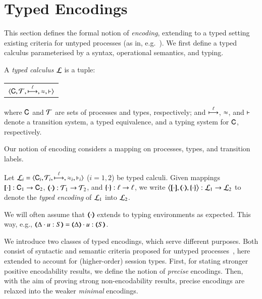 
\section{Typed Encodings}
\label{s:expr}
\label{sec:enc}

This section defines the formal notion of \emph{encoding}, 
extending to a typed setting existing criteria for untyped processes (as in,
e.g.~\cite{Nestmann00,Palamidessi03,DBLP:conf/lics/PalamidessiSVV06,DBLP:journals/iandc/Gorla10,DBLP:conf/icalp/LanesePSS10}). 
We first define a typed calculus parameterised by a syntax, operational semantics, and typing.

\begin{definition}\rm
	\label{d:tcalculus}
	A \emph{typed calculus} $\mathcal{L}$ is a tuple:
	\begin{center}
		\begin{tabular}{c}
			$\langle \mathsf{C}, \cal{T}, \stackrel{\ell}{\longmapsto}, \approx, \vdash \rangle$
		\end{tabular}
	\end{center}
	\noi where $\mathsf{C}$ and $\cal{T}$ are sets of processes and types, 
	respectively; and $\stackrel{\ell}{\longmapsto}$, $\approx$, and $\vdash$ 
	denote a transition system, a typed equivalence, and a typing system for $\mathsf{C}$, respectively. 
\end{definition}

\noi Our notion of encoding considers a mapping on processes, 
types, and transition labels.  

\begin{definition}\rm
        Let  $\mathcal{L}_i=\langle \mathsf{C}_i, {\cal{T}}_i, \stackrel{\ell}{\longmapsto}, \approx_i, \vdash_i \rangle$
        ($i=1,2$) be typed calculi. 
	Given mappings $[\!\![\cdot]\!\!]: \mathsf{C}_1 \to \mathsf{C}_2$, 
	$(\!\!\langle\cdot\rangle\!\!): {\cal{T}}_1 \to {\cal{T}}_2$, and 
	$\{\!\!\{\cdot\}\!\!\}: \ell \to \ell$, 
	we write 
	$\enco{\map{\cdot}, \mapt{\cdot}, \mapa{\cdot}} : \tyl{L}_1 \to \tyl{L}_2$ to denote the \emph{typed encoding} of $\mathcal{L}_1$ into $\mathcal{L}_2$.
\end{definition}

\noi We will often assume that  $(\!\!\langle\cdot\rangle\!\!)$ extends to typing
environments as expected. This way, e.g., $\mapt{\Delta \cat u:S} = \mapt{\Delta} \cat u:\mapt{S}$.

We introduce two classes of typed encodings, which 
serve different purposes.
Both  consist of syntactic and semantic criteria 
proposed for untyped processes~\cite{Palamidessi03,DBLP:journals/iandc/Gorla10,DBLP:conf/icalp/LanesePSS10},
here extended to account for (higher-order) session types.
First, for stating stronger positive encodability results, 
we define the notion of {\em precise} encodings.
Then, 
with the aim of proving strong non-encodability results, 
precise encodings are relaxed into the weaker {\em minimal} encodings. 

